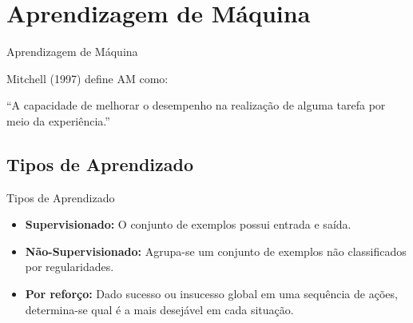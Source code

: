 \documentclass{beamer}
\begin{document}

\section{Aprendizagem de Máquina}
\begin{frame}{Aprendizagem de Máquina}

Mitchell (1997) define AM como:

	\begin{block}{}
	``A capacidade de melhorar o desempenho na realização de alguma tarefa por meio da experiência.''
	\end{block}

\end{frame}

\subsection{Tipos de Aprendizado}
\begin{frame}{Tipos de Aprendizado}

	\begin{itemize}
		\item \textbf{Supervisionado:} O conjunto de exemplos possui entrada e saída.
		\item \textbf{Não-Supervisionado:} Agrupa-se um conjunto de exemplos não classificados por regularidades.
		\item \textbf{Por reforço:} Dado sucesso ou insucesso global em uma sequência de ações, determina-se qual é a mais desejável em cada situação.
	\end{itemize}
	
\end{frame}

\end{document}

